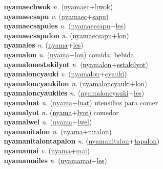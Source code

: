 \textbf{nyamaechwok} \textit{n.} (\hyperref[nyamaec]{nyamaec}+\hyperref[hwok]{hwok})
 \label{nyamaechwok} \\
\textbf{nyamaecsapu} \textit{v.} (\hyperref[nyamaec]{nyamaec}+\hyperref[sapu]{sapu})
 \label{nyamaecsapu} \\
\textbf{nyamaecsapules} \textit{n.} (\hyperref[nyamaecsapu]{nyamaecsapu}+\hyperref[les]{les})
 \label{nyamaecsapules} \\
\textbf{nyamaecsapulon} \textit{n.} (\hyperref[nyamaecsapu]{nyamaecsapu}+\hyperref[lon]{lon})
 \label{nyamaecsapulon} \\
\textbf{nyamales} \textit{n.} (\hyperref[nyama]{nyama}+\hyperref[les]{les})
 \label{nyamales} \\
\textbf{nyamalon} \textit{n.} (\hyperref[nyama]{nyama}+\hyperref[lon]{lon})
comida; bebida \label{nyamalon} \\
\textbf{nyamalonestakilyot} \textit{n.} (\hyperref[nyamalon]{nyamalon}+\hyperref[estakilyot]{estakilyot})
 \label{nyamalonestakilyot} \\
\textbf{nyamaloncyauki} \textit{v.} (\hyperref[nyamalon]{nyamalon}+\hyperref[cyauki]{cyauki})
 \label{nyamaloncyauki} \\
\textbf{nyamaloncyaukilon} \textit{n.} (\hyperref[nyamaloncyauki]{nyamaloncyauki}+\hyperref[lon]{lon})
 \label{nyamaloncyaukilon} \\
\textbf{nyamaloncyaukiles} \textit{n.} (\hyperref[nyamaloncyauki]{nyamaloncyauki}+\hyperref[les]{les})
 \label{nyamaloncyaukiles} \\
\textbf{nyamaluat} \textit{n.} (\hyperref[nyama]{nyama}+\hyperref[luat]{luat})
utensilios para comer \label{nyamaluat} \\
\textbf{nyamalyot} \textit{n.} (\hyperref[nyama]{nyama}+\hyperref[lyot]{lyot})
comedor \label{nyamalyot} \\
\textbf{nyamalwel} \textit{n.} (\hyperref[nyama]{nyama}+\hyperref[lwel]{lwel})
 \label{nyamalwel} \\
\textbf{nyamanitalon} \textit{n.} (\hyperref[nyama]{nyama}+\hyperref[nitalon]{nitalon})
 \label{nyamanitalon} \\
\textbf{nyamanitalontapalon} \textit{n.} (\hyperref[nyamanitalon]{nyamanitalon}+\hyperref[tapalon]{tapalon})
 \label{nyamanitalontapalon} \\
\textbf{nyamamai} \textit{v.} (\hyperref[nyama]{nyama}+\hyperref[mai]{mai})
 \label{nyamamai} \\
\textbf{nyamamailes} \textit{n.} (\hyperref[nyamamai]{nyamamai}+\hyperref[les]{les})
 \label{nyamamailes} \\
